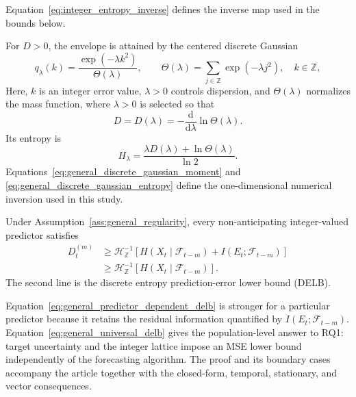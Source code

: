 \documentclass[applsci,article,accept,moreauthors]{Definitions/mdpi}
\def\hl#1{#1}%
\begin{document}
\hl{Equation}~\eqref{eq:integer_entropy_inverse} \hl{defines the inverse map used in the bounds below.}

For \(D>0\), the envelope is attained by the centered discrete Gaussian
\begin{equation}
q_\lambda(k)
=
\frac{\exp(-\lambda k^2)}{\Theta(\lambda)},
\qquad
\Theta(\lambda)=\sum_{j\in\mathbb Z}\exp(-\lambda j^2),
\quad k\in\mathbb Z,
\label{eq:general_discrete_gaussian}
\end{equation}
{\hl{Here}, \(k\) is an integer error value, \(\lambda>0\) controls
dispersion, and \(\Theta(\lambda)\) normalizes the mass function,}
where \(\lambda>0\) is selected so that
\begin{equation}
D=D(\lambda)
=-\frac{\mathrm d}{\mathrm d\lambda}\ln\Theta(\lambda).
\label{eq:general_discrete_gaussian_moment}
\end{equation}
\hl{Its} entropy is
\begin{equation}
H_\lambda
=
\frac{\lambda D(\lambda)+\ln\Theta(\lambda)}{\ln2}.
\label{eq:general_discrete_gaussian_entropy}
\end{equation}
\hl{Equations}~\eqref{eq:general_discrete_gaussian_moment} and
\eqref{eq:general_discrete_gaussian_entropy} define the one-dimensional
numerical inversion used in this study.

\begin{Theorem}
\label{thm:exact_delb}
Under Assumption~\ref{ass:general_regularity}, every non-anticipating integer-valued
predictor satisfies
\begin{align}
D_t^{(m)}
&\geq
\mathcal H_{\mathbb Z}^{-1}\!\left[
H(X_t\mid\mathcal F_{t-m})
+I(E_t;\mathcal F_{t-m})
\right]
\label{eq:general_predictor_dependent_delb}\\
&\geq
\mathcal H_{\mathbb Z}^{-1}\!\left[
H(X_t\mid\mathcal F_{t-m})
\right].
\label{eq:general_universal_delb}
\end{align}
The second line is the discrete entropy prediction-error lower bound
(DELB).
\end{Theorem}

\hl{Equation}~\eqref{eq:general_predictor_dependent_delb} \hl{is stronger for a
particular predictor because it retains the residual information quantified
by} \(I(E_t;\mathcal F_{t-m})\).
\hl{Equation}~\eqref{eq:general_universal_delb} \hl{gives the population-level answer
to RQ1: target uncertainty and the integer lattice impose an MSE lower bound
independently of the forecasting algorithm.} The proof and its boundary cases accompany
the article together with the closed-form, temporal, stationary, and vector
consequences.
\end{document}
